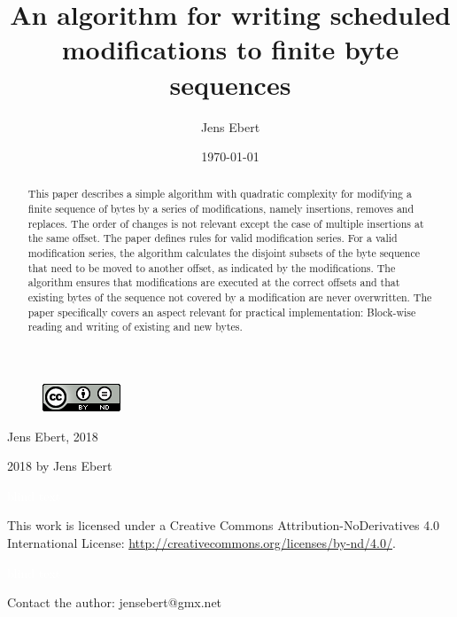 \documentclass[english, 10pt, openright, twocolumn, landscape, twoside, notitlepage, a4paper, pdftex]		
{article}
\title{An algorithm for writing scheduled modifications to finite byte sequences}
\author{Jens Ebert}
\date{\today}
\begin{document}
\maketitle



\begin{figure}
\includegraphics{figures/CClicense_BY_ND.PNG}
\end{figure}

Jens Ebert, 2018

\textcopyright{} 2018 by Jens Ebert

\textcolor{white}{blind text} \linebreak

This work is licensed under a Creative Commons Attribution-NoDerivatives 4.0 International License: \url{http://creativecommons.org/licenses/by-nd/4.0/}.

\textcolor{white}{blind text} \linebreak

Contact the author: jensebert@gmx.net

\begin{abstract}
This paper describes a simple algorithm with quadratic complexity for modifying a finite sequence of bytes by a series of modifications, namely insertions, removes and replaces. The order of changes is not relevant except the case of multiple insertions at the same offset. The paper defines rules for valid modification series. For a valid modification series, the algorithm calculates the disjoint subsets of the byte sequence that need to be moved to another offset, as indicated by the modifications. The algorithm ensures that modifications are executed at the correct offsets and that existing bytes of the sequence not covered by a modification are never overwritten. The paper specifically covers an aspect relevant for practical implementation: Block-wise reading and writing of existing and new bytes.
\end{abstract}


\end{document}
